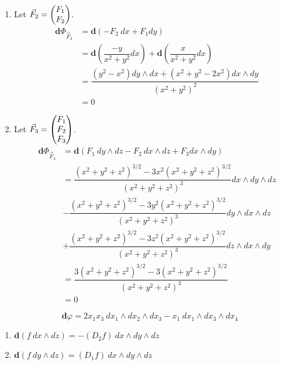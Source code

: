 \documentclass{homework}
\begin{document}
\begin{problem}{2}
  \begin{enumerate}
    \item
      Let $\vec{F}_2 = \begin{pmatrix}F_1 \\ F_2\end{pmatrix}$.
      \begin{align*}
        \mathbf{d}\Phi_{\vec{F}_2} &=
        \mathbf{d}(-F_2\ dx + F_1 dy) \\ &=
        \mathbf{d}\left( \dfrac{-y}{x^2+y^2} dx \right) +
        \mathbf{d}\left( \dfrac{x}{x^2+y^2} dx \right) \\ &=
        \dfrac
          {(y^2-x^2)dy \land dx + (x^2 + y^2 - 2x^2)dx \land dy}
          {(x^2+y^2)^2} \\ &= 0
      \end{align*}
    \item
      Let $\vec{F}_3 = \begin{pmatrix}F_1 \\ F_2 \\ F_3\end{pmatrix}$.
      \begin{align*}
        \mathbf{d}\Phi_{\vec{F}_3} &=
        \mathbf{d}(F_1\ dy \land dz - F_2\ dx \land dz + F_3 dx \land dy) \\ &=
        \dfrac
          {(x^2+y^2+z^2)^{3/2} - 3x^2(x^2+y^2+z^2)^{3/2}}
          {(x^2+y^2+z^2)^3} dx \land dy \land dz \\ &-
        \dfrac
          {(x^2+y^2+z^2)^{3/2} - 3y^2(x^2+y^2+z^2)^{3/2}}
          {(x^2+y^2+z^2)^3} dy \land dx \land dz \\ &+
        \dfrac
          {(x^2+y^2+z^2)^{3/2} - 3z^2(x^2+y^2+z^2)^{3/2}}
          {(x^2+y^2+z^2)^3} dz \land dx \land dy \\ &=
        \dfrac
          {3(x^2+y^2+z^2)^{3/2} - 3(x^2+y^2+z^2)^{3/2}}
          {(x^2+y^2+z^2)^3} \\ &= 0
      \end{align*}
  \end{enumerate}
\end{problem}

\begin{problem}{3}
  $$\mathbf{d}\varphi
  = 2x_1x_3\ dx_1 \land dx_2 \land dx_3
  - x_1\ dx_1 \land dx_3 \land dx_4
  $$
\end{problem}

\begin{problem}{4}
  \begin{enumerate}
    \item
      $\mathbf{d}(f\ dx \land dz) = -(D_2f)\ dx \land dy \land dz$
    \item
      $\mathbf{d}(f\ dy \land dz) = (D_1f)\ dx \land dy \land dz$
  \end{enumerate}
\end{problem}
\end{document}
